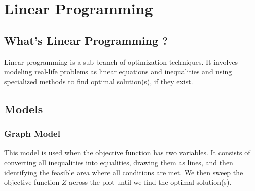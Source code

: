\section{Linear Programming}
\subsection{What's Linear Programming ?}
\begin{tcolorbox}[title = Definition] 
Linear programming is a sub-branch of optimization techniques. It involves modeling real-life problems as
linear equations and inequalities and using specialized methods to find optimal solution(s), if they exist.
\end{tcolorbox}
\vspace{1cm}
\begin{center}
\end{center}
\vspace{1cm}
\subsection{Models}
\subsubsection{Graph Model}
This model is used when the objective function has two variables. It consists of converting all inequalities
into equalities, drawing them as lines, and then identifying the feasible area where all conditions are met.
We then sweep the objective function \(Z\) across the plot until we find the optimal solution(s).

